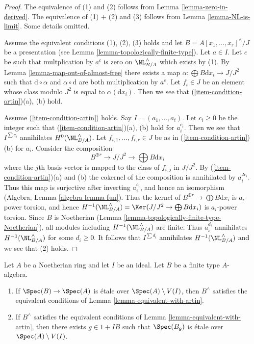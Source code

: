 \begin{proof}
The equivalence of (1) and (2) follows from
Lemma \ref{lemma-zero-in-derived}.
The equivalence of (1) $+$ (2) and (3) follows from
Lemma \ref{lemma-NL-is-limit}. Some details omitted.

\medskip\noindent
Assume the equivalent conditions (1), (2), (3) holds and let
$B = A[x_1, \ldots, x_r]^\wedge/J$ be a presentation
(see Lemma \ref{lemma-topologically-finite-type}). Let $a \in I$.
Let $c$ be such that multplication by $a^c$ is zero on $\NL^\wedge_{B/A}$
which exists by (1). By Lemma \ref{lemma-map-out-of-almost-free}
there exists a map $\alpha : \bigoplus B\text{d}x_i \to J/J^2$ such that
$\text{d} \circ \alpha$ and $\alpha \circ \text{d}$ are both
multiplication by $a^c$. Let $f_i \in J$ be an element whose
class modulo $J^2$ is equal to $\alpha(\text{d}x_i)$.
Then we see that (\ref{item-condition-artin})(a), (b) hold.

\medskip\noindent
Assume (\ref{item-condition-artin}) holds. Say $I = (a_1, \ldots, a_t)$.
Let $c_i \geq 0$ be the integer such that (\ref{item-condition-artin})(a), (b)
hold for $a_i^{c_i}$. Then we see that $I^{\sum c_i}$ annihilates
$H^0(\NL^\wedge_{B/A})$. Let $f_{i, 1}, \ldots, f_{i, r} \in J$
be as in (\ref{item-condition-artin})(b) for $a_i$.
Consider the composition
$$
B^{\oplus r} \to J/J^2 \to \bigoplus B\text{d}x_i
$$
where the $j$th basis vector is mapped to the class of $f_{i, j}$ in $J/J^2$.
By (\ref{item-condition-artin})(a) and (b) the cokernel of the composition
is annihilated by $a_i^{2c_i}$. Thus this map is surjective after inverting
$a_i^{c_i}$, and hence an isomorphism (Algebra, Lemma \ref{algebra-lemma-fun}).
Thus the kernel of $B^{\oplus r} \to \bigoplus B\text{d}x_i$ is
$a_i$-power torsion, and hence
$H^{-1}(\NL^\wedge_{B/A}) = \Ker(J/J^2 \to \bigoplus B\text{d}x_i)$
is $a_i$-power torsion. Since $B$ is Noetherian
(Lemma \ref{lemma-topologically-finite-type-Noetherian}),
all modules including $H^{-1}(\NL^\wedge_{B/A})$ are finite.
Thus $a_i^{d_i}$ annihilates $H^{-1}(\NL^\wedge_{B/A})$ for some $d_i \geq 0$.
It follows that $I^{\sum d_i}$ annihilates $H^{-1}(\NL^\wedge_{B/A})$
and we see that (2) holds.
\end{proof}

\begin{lemma}
\label{lemma-rig-etale}
Let $A$ be a Noetherian ring and let $I$ be an ideal.
Let $B$ be a finite type $A$-algebra.
\begin{enumerate}
\item If $\Spec(B) \to \Spec(A)$ is \'etale over $\Spec(A) \setminus V(I)$,
then $B^\wedge$ satisfies the equivalent conditions of
Lemma \ref{lemma-equivalent-with-artin}.
\item If $B^\wedge$ satisfies the equivalent conditions of
Lemma \ref{lemma-equivalent-with-artin},
then there exists $g \in 1 + IB$ such that $\Spec(B_g)$ is \'etale
over $\Spec(A) \setminus V(I)$.
\end{enumerate}
\end{lemma}

